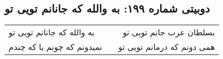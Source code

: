 \begin{center}
\section*{دوبیتی شماره ۱۹۹: به والله که جانانم تویی تو}
\label{sec:199}
\begin{longtable}{l p{0.5cm} r}
به والله که جانانم تویی تو
&&
بسلطان عرب جانم تویی تو
\\
نمیدونم که چونم یا که چندم
&&
همی دونم که درمانم تویی تو
\\
\end{longtable}
\end{center}

